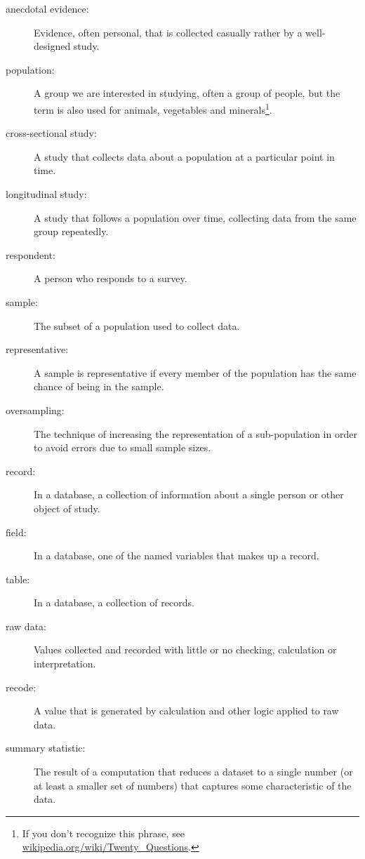 \documentclass[10pt]{book}
\begin{document}
\begin{description}

\item[anecdotal evidence:] Evidence, often personal, that is collected
  casually rather by a well-designed study.

\item[population:] A group we are interested in studying, often a
  group of people, but the term is also used for animals, vegetables
  and minerals\footnote{If you don't recognize this phrase, see
    \url{wikipedia.org/wiki/Twenty_Questions}.}.

\item[cross-sectional study:] A study that collects data about a
population at a particular point in time.

\item[longitudinal study:] A study that follows a population over
time, collecting data from the same group repeatedly.

\item[respondent:] A person who responds to a survey.

\item[sample:] The subset of a population used to collect data.

\item[representative:] A sample is representative if every member
of the population has the same chance of being in the sample.

\item[oversampling:] The technique of increasing the representation
of a sub-population in order to avoid errors due to small sample
sizes.

\item[record:] In a database, a collection of information about
a single person or other object of study.

\item[field:] In a database, one of the named variables that makes
up a record.

\item[table:] In a database, a collection of records.

\item[raw data:] Values collected and recorded with little or no
checking, calculation or interpretation.

\item[recode:] A value that is generated by calculation and other
logic applied to raw data.

\item[summary statistic:] The result of a computation that reduces
a dataset to a single number (or at least a smaller set of numbers)
that captures some characteristic of the data.


\end{description}
\end{document}
